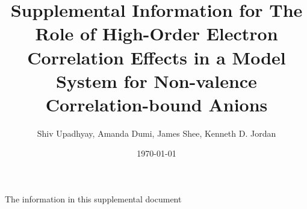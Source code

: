 \documentclass[12pt]{article}
\title{Supplemental Information for The Role of High-Order Electron Correlation Effects in a Model System for Non-valence Correlation-bound Anions}
\author{Shiv Upadhyay, Amanda Dumi, James Shee, Kenneth D. Jordan}
\date{\today}
\begin{document}
\maketitle
\tableofcontents
\newpage
The information in this supplemental document 


\newpage


\end{document}
